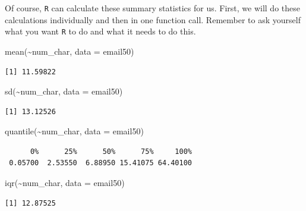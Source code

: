 \documentclass[
  letterpaper,
  DIV=11,
  numbers=noendperiod]{scrreprt}
\newenvironment{Shaded}{\begin{snugshade}}{\end{snugshade}}
\newcommand{\AttributeTok}[1]{\textcolor[rgb]{0.40,0.45,0.13}{#1}}
\newcommand{\FunctionTok}[1]{\textcolor[rgb]{0.28,0.35,0.67}{#1}}
\newcommand{\NormalTok}[1]{\textcolor[rgb]{0.00,0.23,0.31}{#1}}
\newcommand{\SpecialCharTok}[1]{\textcolor[rgb]{0.37,0.37,0.37}{#1}}
\begin{document}
Of course, \texttt{R} can calculate these summary statistics for us.
First, we will do these calculations individually and then in one
function call. Remember to ask yourself what you want \texttt{R} to do
and what it needs to do this.

\begin{Shaded}
\begin{Highlighting}[]
\FunctionTok{mean}\NormalTok{(}\SpecialCharTok{\textasciitilde{}}\NormalTok{num\_char, }\AttributeTok{data =}\NormalTok{ email50)}
\end{Highlighting}
\end{Shaded}

\begin{verbatim}
[1] 11.59822
\end{verbatim}

\begin{Shaded}
\begin{Highlighting}[]
\FunctionTok{sd}\NormalTok{(}\SpecialCharTok{\textasciitilde{}}\NormalTok{num\_char, }\AttributeTok{data =}\NormalTok{ email50)}
\end{Highlighting}
\end{Shaded}

\begin{verbatim}
[1] 13.12526
\end{verbatim}

\begin{Shaded}
\begin{Highlighting}[]
\FunctionTok{quantile}\NormalTok{(}\SpecialCharTok{\textasciitilde{}}\NormalTok{num\_char, }\AttributeTok{data =}\NormalTok{ email50)}
\end{Highlighting}
\end{Shaded}

\begin{verbatim}
      0%      25%      50%      75%     100% 
 0.05700  2.53550  6.88950 15.41075 64.40100 
\end{verbatim}

\begin{Shaded}
\begin{Highlighting}[]
\FunctionTok{iqr}\NormalTok{(}\SpecialCharTok{\textasciitilde{}}\NormalTok{num\_char, }\AttributeTok{data =}\NormalTok{ email50)}
\end{Highlighting}
\end{Shaded}

\begin{verbatim}
[1] 12.87525
\end{verbatim}
\end{document}

